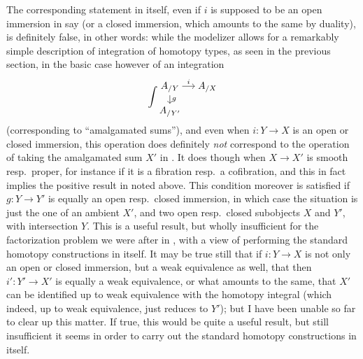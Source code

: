 The corresponding statement in \Cat{} itself, even if $i$ is
supposed to be an open immersion in \Cat{} say (or a
closed immersion, which amounts to the same by duality), is definitely
false, in other words: while the modelizer \Cat{} allows for a
remarkably simple description of integration of homotopy types, as
seen in the previous section, in the basic case however of an
integration
\[\int \begin{tikzcd}[cramped,sep=small]
  A_{/Y}\ar[r,"i"]\ar[d,"g"] & A_{/X} \\ A_{/Y'} &
\end{tikzcd}\]
(corresponding  to ``amalgamated sums''), and even when $i:Y\to X$ is
an open or closed immersion, this operation does definitely \emph{not}
correspond to the operation of taking the amalgamated sum $X'$ in
\Cat. It does though when $X\to X'$ is smooth resp.\ proper, for
instance if it is a fibration resp.\ a cofibration, and this in fact
implies the positive result in \Ahat{} noted above. This condition
moreover is satisfied if $g: Y\to Y'$ is equally an open resp.\ closed
immersion, in which case the situation is just the one of an ambient
$X'$, and two open resp.\ closed subobjects $X$ and $Y'$, with
intersection $Y$. This is a useful result, but wholly insufficient for
the factorization problem we were after in \Cat, with a view of
performing the standard homotopy constructions in \Cat{} itself. It
may be true still that if $i:Y\to X$ is not only an open or closed
immersion, but a weak equivalence as well, that then $i':Y'\to X'$ is
equally a weak equivalence, or what amounts to the same, that $X'$ can
be identified up to weak equivalence with the homotopy integral (which
indeed, up to weak equivalence, just reduces to $Y'$); but I have been
unable so far to clear up this matter. If true, this would be quite a
useful result, but still insufficient it seems in order to carry out
the standard homotopy constructions in \Cat{} itself.

